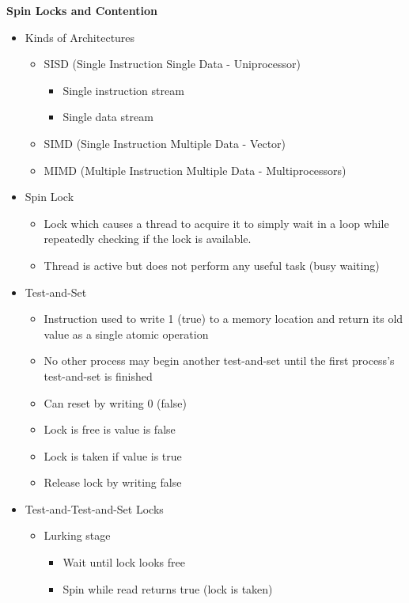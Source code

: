 \documentclass[12pt]{article}
\newcommand{\cname}[1]{\large \textbf{#1}}
\begin{document}
{		\pagebreak
		\cname{Spin Locks and Contention}
		\begin{itemize}
			\item Kinds of Architectures
			\begin{itemize}
				\item SISD (Single Instruction Single Data - Uniprocessor)
				\begin{itemize}
					\item Single instruction stream
					\item Single data stream
				\end{itemize}
				\item SIMD (Single Instruction Multiple Data - Vector)
				\item MIMD (Multiple Instruction Multiple Data - Multiprocessors)
			\end{itemize}
			\item Spin Lock
			\begin{itemize}
				\item Lock which causes a thread to acquire it to simply wait in a loop while repeatedly checking if the lock is available.
				\item Thread is active but does not perform any useful task (busy waiting)
			\end{itemize}
			\item Test-and-Set
			\begin{itemize}
				\item Instruction used to write 1 (true) to a memory location and return its old value as a single atomic operation
				\item No other process may begin another test-and-set until the first process's test-and-set is finished
				\item Can reset by writing 0 (false)
				\item Lock is free is value is false
				\item Lock is taken if value is true
				\item Release lock by writing false
			\end{itemize}
			\item Test-and-Test-and-Set Locks
			\begin{itemize}
				\item Lurking stage
				\begin{itemize}
					\item Wait until lock looks free
					\item Spin while read returns true (lock is taken)
				\end{itemize}

\end{itemize}
\end{itemize}}
\end{document}

